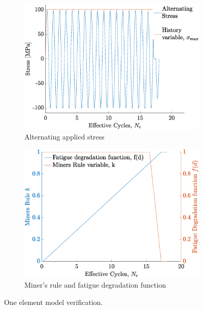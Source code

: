 \documentclass[11pt,a4paper]{article}
\begin{document}
\begin{figure} [ht]
\begin{subfigure}{0.51\textwidth}
\centering
\includegraphics[scale=0.36]{stress.eps}
\caption{Alternating applied stress}
\label{one_element_alternating}
\end{subfigure}
\begin{subfigure}{0.5\textwidth}
\centering
\includegraphics[scale=0.36]{miner_fatigue.eps}
\caption{Miner's rule and fatigue degradation function}
\label{miner and fatigue}
\end{subfigure}
\caption{One element model verification.}
\label{one element}
\end{figure}
\end{document}

